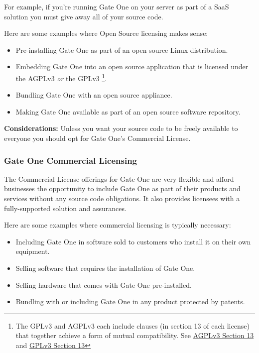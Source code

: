 \documentclass[letterpaper,10pt,openany]{sphinxmanual}
\begin{document}
For example, if you're running Gate One on your server as part of a SaaS solution you must give away all of your source code.

Here are some examples where Open Source licensing makes sense:
\begin{itemize}
\item {} 
Pre-installing Gate One as part of an open source Linux distribution.

\item {} 
Embedding Gate One into an open source application that is licensed under the AGPLv3 \emph{or} the GPLv3 \footnote{
The GPLv3 and AGPLv3 each include clauses (in section 13 of each license) that together achieve a form of mutual compatibility.  See \href{http://www.gnu.org/licenses/agpl.html\#section13}{AGPLv3 Section 13} and \href{http://www.gnu.org/licenses/gpl.html\#section13}{GPLv3 Section 13}
}.

\item {} 
Bundling Gate One with an open source appliance.

\item {} 
Making Gate One available as part of an open source software repository.

\end{itemize}

\textbf{Considerations:} Unless you want your source code to be freely available to everyone you should opt for Gate One's Commercial License.


\subsubsection{Gate One Commercial Licensing}
\label{About/licensing:gate-one-commercial-licensing}
The Commercial License offerings for Gate One are very flexible and afford businesses the opportunity to include Gate One as part of their products and services without any source code obligations.  It also provides licensees with a fully-supported solution and assurances.

Here are some examples where commercial licensing is typically necessary:
\begin{itemize}
\item {} 
Including Gate One in software sold to customers who install it on their own equipment.

\item {} 
Selling software that requires the installation of Gate One.

\item {} 
Selling hardware that comes with Gate One pre-installed.

\item {} 
Bundling with or including Gate One in any product protected by patents.

\end{itemize}
\end{document}

